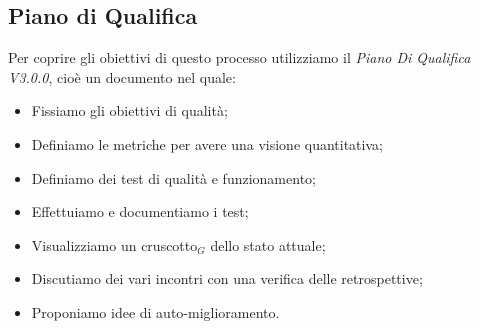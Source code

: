   \subsection{Piano di Qualifica}
  Per coprire gli obiettivi di questo processo utilizziamo il \textit{Piano Di Qualifica V3.0.0}, cioè un documento nel quale:
  \begin{itemize}
      \item Fissiamo gli obiettivi di qualità;
      \item Definiamo le metriche per avere una visione quantitativa;
      \item Definiamo dei test di qualità e funzionamento;
      \item Effettuiamo e documentiamo i test;
      \item Visualizziamo un cruscotto$_G$ dello stato attuale;
      \item Discutiamo dei vari incontri con una verifica delle retrospettive;
      \item Proponiamo idee di auto-miglioramento.
  \end{itemize}

